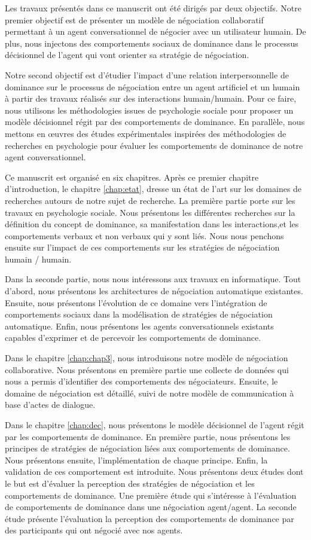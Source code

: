 Les travaux présentés dans ce manuscrit ont été dirigés	par deux objectifs. 
Notre premier objectif est de présenter un modèle de négociation collaboratif permettant à un agent conversationnel de négocier avec un utilisateur humain. De plus, nous injectons des comportements sociaux de dominance dans le processus décisionnel de l'agent qui vont orienter sa stratégie de négociation.

Notre second objectif est d'étudier l'impact d'une relation interpersonnelle de dominance sur le processus de négociation entre un agent artificiel et un humain à partir des travaux réalisés sur des interactions humain/humain.
Pour ce faire, nous utilisons les méthodologies issues de psychologie sociale pour proposer un modèle décisionnel régit par des comportements de dominance. En parallèle, nous mettons en œuvres des études expérimentales inspirées des méthodologies de recherches en psychologie pour évaluer les comportements de dominance de notre agent conversationnel.  


Ce manuscrit est organisé en six chapitres.
Après ce premier chapitre d'introduction, le chapitre \ref{chap:etat}, dresse un état de l'art sur les domaines de recherches autours de notre sujet de recherche. La première partie porte sur les travaux en psychologie sociale. Nous présentons les différentes recherches sur la définition du concept de dominance, sa manifestation dans les interactions,et les comportements verbaux et non verbaux qui y sont liés. Nous nous penchons ensuite sur l'impact de ces comportements sur les stratégies de négociation humain / humain. 

Dans la seconde partie, nous nous intéressons aux travaux en informatique. Tout d'abord, nous présentons les architectures de négociation automatique existantes. Ensuite, nous présentons l'évolution de ce domaine vers l'intégration de comportements sociaux dans la modélisation de stratégies de négociation automatique. Enfin, nous présentons les agents conversationnels existants capables d'exprimer et de percevoir les comportements de dominance. 

Dans le chapitre \ref{chap:chap3}, nous introduisons notre modèle de négociation collaborative. Nous présentons en première partie une collecte de données qui nous a permis d'identifier des comportements des négociateurs. Ensuite, le domaine de négociation est détaillé, suivi de notre modèle de communication à base d'actes de dialogue. 

Dans le chapitre \ref{chap:dec}, nous présentons le modèle décisionnel de l'agent régit par les comportements de dominance. En première partie, nous présentons les principes de stratégies de négociation liées aux comportements de dominance. Nous présentons ensuite, l'implémentation de chaque principe. Enfin, la validation de ces comportement est introduite. Nous présentons deux études dont le but est d'évaluer la perception des stratégies de négociation et les comportements de dominance. Une première étude qui s'intéresse à l'évaluation de comportements de dominance dans une négociation agent/agent. La seconde étude présente l'évaluation la perception des comportements de dominance par des participants qui ont négocié avec nos agents.

